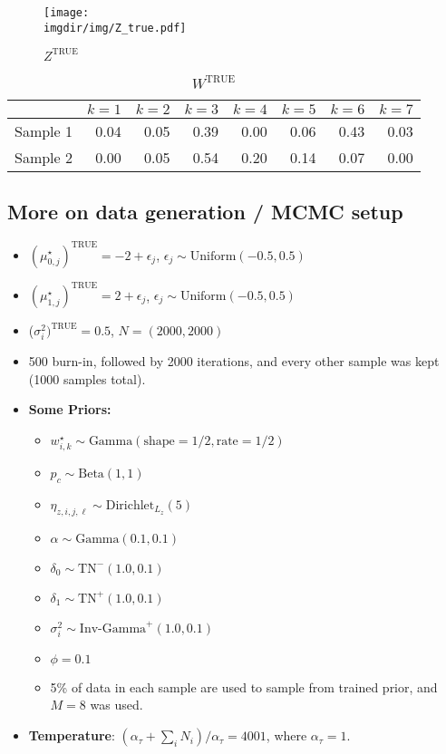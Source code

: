 \documentclass[10pt]{article} %
\newcommand{\Gam}{ \text{Gamma} }
\newcommand{\InvGamma}{ \text{Inv-Gamma} }
\newcommand{\Uniform}{ \text{Uniform} }
\def\Dir{\text{Dirichlet}}
\def\TN{\text{TN}}
\def\true{\text{TRUE}}
\def\imgdir{../../results/test-sim-6-7-7-test/pthin8-batchprop0.05-alpha1.0-N2000}
\begin{document}
\begin{figure}[H]
  \begin{center}  %
    \texttt{[image: \\imgdir/img/Z\_true.pdf]}
  \end{center}
  \caption{$Z^\true$}
  \label{fig:Z-true}
\end{figure}

\begin{table}[ht]
  \centering
  \begin{tabular}{rrrrrrrr}
    \hline
    & $k=1$ & $k=2$ & $k=3$ & $k=4$ & $k=5$ & $k=6$ & $k=7$ \\
    \hline
    Sample 1 & 0.04 & 0.05 & 0.39 & 0.00 & 0.06 & 0.43 & 0.03 \\
    Sample 2 & 0.00 & 0.05 & 0.54 & 0.20 & 0.14 & 0.07 & 0.00 \\
    \hline
  \end{tabular}
  \caption{$W^\true$}
  \label{tab:W-true}
\end{table}

\subsection{More on data generation / MCMC setup}
\begin{itemize}
  \item $(\mu_{0,j}^\star)^\true=-2 + \epsilon_j$, $\epsilon_j \sim \Uniform(-0.5, 0.5)$
  \item $(\mu_{1,j}^\star)^\true=2 + \epsilon_j$, $\epsilon_j \sim \Uniform(-0.5, 0.5)$
  \item ($\sigma^2_i)^\true=0.5$, $N=(2000, 2000)$
  \item 500 burn-in, followed by 2000 iterations, and every other sample was
    kept (1000 samples total).
  \item \textbf{Some Priors:}
  \begin{itemize}
    \item $w^\star_{i,k} \sim \Gam(\text{shape}=1/2, \text{rate}=1/2)$
    \item $p_c \sim \text{Beta}(1, 1)$
    \item $\eta_{z, i,j,\ell} \sim \Dir_{L_z}(5)$
    \item $\alpha \sim \Gam(0.1, 0.1)$
    \item $\delta_0 \sim \TN^-(1.0, 0.1)$
    \item $\delta_1 \sim \TN^+(1.0, 0.1)$
    \item $\sigma^2_i \sim \InvGamma^+(1.0, 0.1)$
    \item $\phi=0.1$
    \item 5\% of data in each sample are used to sample from trained prior, and
      $M=8$ was used.
  \end{itemize}
\item \textbf{Temperature}: $(\alpha_\tau + \sum_{i} N_i) / \alpha_\tau = 4001$, 
  where $\alpha_\tau = 1$.
\end{itemize}
\end{document}
